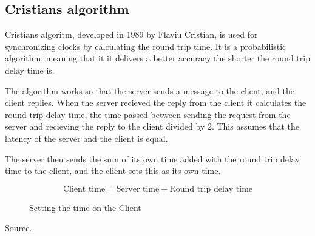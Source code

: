\subsection{Cristians algorithm}
Cristians algoritm, developed in 1989 by Flaviu Cristian, is used for synchronizing clocks by calculating the round trip time. It is a probabilistic algorithm\cite{cristian}, meaning that it it delivers a better accuracy the shorter the round trip delay time is. 

The algorithm works so that the server sends a message to the client, and the client replies. When the server recieved the reply from the client it calculates the round trip delay time, the time passed between sending the request from the server and recieving the reply to the client divided by 2. This assumes that the latency of the server and the client is equal.

The server then sends the sum of its own time added with the round trip delay time to the client, and the client sets this as its own time. 

\begin{figure}[h!]
	\begin{displaymath}
		\text{Client time} = \text{Server time} + \text{Round trip delay time}
	\end{displaymath}
	\caption{Setting the time on the Client}
	\label{fig:crist}
\end{figure}

Source\cite{cristian}.
